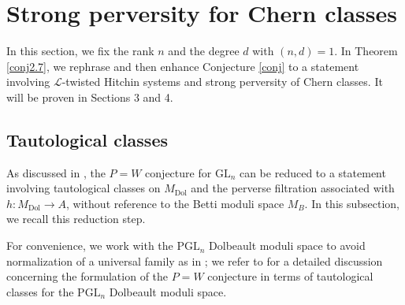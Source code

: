 \documentclass[11pt]{amsart}
\theoremstyle{plain}
\theoremstyle{definition}
\theoremstyle{remark}
\newcommand{\CL}{{\mathcal L}}
\begin{document}
\section{Strong perversity for Chern classes}

In this section, we fix the rank $n$ and the degree $d$ with $(n,d)=1$. In Theorem \ref{conj2.7}, we rephrase and then enhance Conjecture \ref{conj} to a statement involving $\CL$-twisted Hitchin systems and strong perversity of Chern classes. It will be proven in Sections 3 and 4.

\subsection{Tautological classes}

As discussed in \cite[Section 0.3]{dCMS}, the $P=W$ conjecture for $\mathrm{GL}_n$ can be reduced to a statement involving tautological classes on $M_{\mathrm{Dol}}$ and the perverse filtration associated with $h: M_{\mathrm{Dol}} \to A$, without reference to the Betti moduli space $M_B$. In this subsection, we recall this reduction step.


For convenience, we work with the $\mathrm{PGL}_n$ Dolbeault moduli space to avoid normalization of a universal family as in \cite{dCMS}; we refer to \cite{Shende} for a detailed discussion concerning the formulation of the $P=W$ conjecture in terms of tautological classes for the $\mathrm{PGL}_n$ Dolbeault moduli space.
\end{document}
